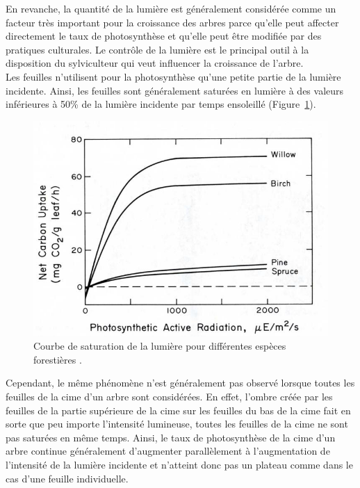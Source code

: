 En revanche, la quantité de la lumière est généralement considérée comme un facteur très important pour la croissance des arbres parce qu'elle peut affecter directement le taux de photosynthèse et qu'elle peut être modifiée par des pratiques culturales. Le contrôle de la lumière est le principal outil à la disposition du sylviculteur qui veut influencer la croissance de l'arbre.\\

Les feuilles n'utilisent pour la photosynthèse qu'une petite partie de la lumière incidente. Ainsi, les feuilles sont généralement saturées en lumière à des valeurs inférieures à 50\% de la lumière incidente par temps ensoleillé (Figure~\ref{c_uptake}). 


\begin{figure}[h]
\centering
\includegraphics[scale=0.5]{img/ch2_C_uptake}
\caption{Courbe de saturation de la lumière pour différentes espèces forestières \cite{waring1985forest}. }
\label{c_uptake}
\end{figure}	

Cependant, le même phénomène n'est généralement pas observé lorsque toutes les feuilles de la cime d'un arbre sont considérées. En effet, l'ombre créée par les feuilles de la partie supérieure de la cime sur les feuilles du bas de la cime fait en sorte que peu importe l'intensité lumineuse, toutes les feuilles de la cime ne sont pas saturées en même temps. Ainsi, le taux de photosynthèse de la cime d'un arbre continue généralement d'augmenter parallèlement à l'augmentation de l'intensité de la lumière incidente et n'atteint donc pas un plateau comme dans le cas d'une feuille individuelle.\\

